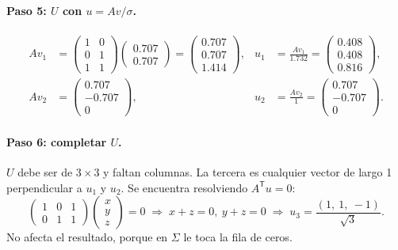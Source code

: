 \documentclass[11pt,letterpaper]{article}
\newcommand{\T}{^{\mathsf{T}}}
\newcommand{\raiz}[1]{\sqrt{#1}}
\begin{document}
\paragraph{Paso 5: $U$ con $u = A v / \sigma$.}
\begin{align*}
    A v_1 &= \begin{pmatrix} 1 & 0 \\ 0 & 1 \\ 1 & 1 \end{pmatrix}
             \begin{pmatrix} 0.707 \\ 0.707 \end{pmatrix}
           = \begin{pmatrix} 0.707 \\ 0.707 \\ 1.414 \end{pmatrix},
    & u_1 &= \frac{A v_1}{1.732}
           = \begin{pmatrix} 0.408 \\ 0.408 \\ 0.816 \end{pmatrix}, \\
    A v_2 &= \begin{pmatrix} 0.707 \\ -0.707 \\ 0 \end{pmatrix},
    & u_2 &= \frac{A v_2}{1}
           = \begin{pmatrix} 0.707 \\ -0.707 \\ 0 \end{pmatrix} .
\end{align*}

\paragraph{Paso 6: completar $U$.} $U$ debe ser de $3 \times 3$ y
faltan columnas. La tercera es cualquier vector de largo 1
perpendicular a $u_1$ y $u_2$. Se encuentra resolviendo $A\T u = 0$:
\[
    \begin{pmatrix} 1 & 0 & 1 \\ 0 & 1 & 1 \end{pmatrix}
    \begin{pmatrix} x \\ y \\ z \end{pmatrix} = 0
    \;\Rightarrow\;
    x + z = 0,\ y + z = 0
    \;\Rightarrow\;
    u_3 = \frac{(1,\ 1,\ -1)}{\raiz{3}} .
\]
No afecta el resultado, porque en $\Sigma$ le toca la fila de ceros.
\end{document}
